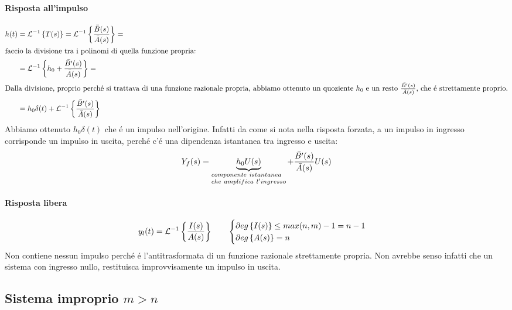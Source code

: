 \documentclass[../main.tex]{subfiles}
\begin{document}
		\paragraph{Risposta all'impulso}
			\begin{align*}
				h(t) &= \mathcal{L}^{-1} \left\lbrace T(s) \right\rbrace = \mathcal{L}^{-1} \left\lbrace \frac{\bar{B}(s)}{\bar{A}(s)} \right\rbrace =
				\\
				\intertext{faccio la divisione tra i polinomi di quella funzione propria:}
				&= \mathcal{L}^{-1} \left\lbrace h_0 + \frac{\bar{B'}(s)}{\bar{A}(s)} \right\rbrace =
				\\
				\intertext{Dalla divisione, proprio perch\'{e} si trattava di una funzione razionale propria, abbiamo ottenuto un quoziente $ h_0 $ e un resto $ \frac{\bar{B'}(s)}{\bar{A}(s)} $, che \'{e} strettamente proprio.}
				&= h_0 \delta(t) + \mathcal{L}^{-1} \left\lbrace \frac{\bar{B'}(s)}{\bar{A}(s)} \right\rbrace
			\end{align*}
			Abbiamo ottenuto $ h_0 \delta(t) $ che \'{e} un impulso nell'origine. Infatti da come si nota nella risposta forzata, a un impulso in ingresso corrisponde un impulso in uscita, perch\'{e} c'\'{e} una dipendenza istantanea tra ingresso e uscita:
			\[
				Y_f(s) = \underbrace{h_0 U(s)}_{\begin{subarray}{l} componente\ istantanea \\ che\ amplifica\ l'ingresso \end{subarray}} + \frac{\bar{B'}(s)}{\bar{A}(s)} U(s)
			\]
		\paragraph{Risposta libera}
			\[
				y_l(t) = \mathcal{L}^{-1} \left\lbrace \frac{I(s)}{A(s)} \right\rbrace \qquad 
				\begin{cases}
					\partial eg \left\lbrace I(s) \right\rbrace \leq max(n,m)-1 = n-1
					\\
					\partial eg \left\lbrace A(s) \right\rbrace = n
				\end{cases}
			\]
			Non contiene nessun impulso perch\'{e} \'{e} l'antitrasformata di un funzione razionale strettamente propria. Non avrebbe senso infatti che un sistema con ingresso nullo, restituisca improvvisamente un impulso in uscita.

	\subsection{Sistema improprio $ m > n $}
\end{document}
